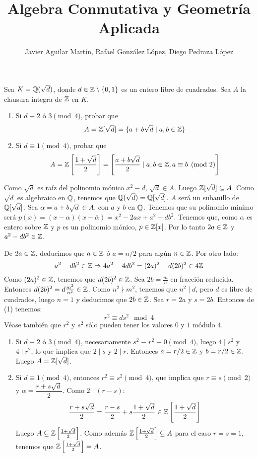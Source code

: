 \documentclass[twoside]{article}
\begin{document}
\title{Algebra Conmutativa y Geometría Aplicada}
\author{Javier Aguilar Martín, Rafael González López, Diego Pedraza López}
\maketitle

\begin{ejercicio}{2}
Sea $K = \mathbb{Q}(\sqrt{d})$, donde $d \in \mathbb{Z}\setminus\{0,1\}$ es un entero libre de cuadrados. Sea $A$ la clausura íntegra de $\mathbb{Z}$ en $K$.
\begin{enumerate}
	\item Si $d \equiv 2$ ó $3 \pmod 4$, probar que
	\[ A = \mathbb{Z}[\sqrt{d}] = \{a + b \sqrt{d} \mid a,b \in \mathbb{Z}\} \]
	
	\item Si $d \equiv 1 \pmod 4$, probar que
	\[ A = \mathbb{Z} \left[\frac{1+\sqrt{d}}{2}\right] = \left[\frac{a+b\sqrt{d}}{2} \mid a,b \in \mathbb{Z}; a \equiv b \pmod 2\right]\]
\end{enumerate}
\end{ejercicio}
\begin{solucion}
Como $\sqrt{d}$ es raíz del polinomio mónico $x^2-d$, $\sqrt{d} \in A$. Luego $\mathbb{Z}[\sqrt{d}] \subseteq A$. Como $\sqrt{d}$ es algebraico en $\mathbb{Q}$, tenemos que $\mathbb{Q}(\sqrt{d})=\mathbb{Q}[\sqrt{d}]$. $A$ será un subanillo de $\mathbb{Q}[\sqrt{d}]$. Sea $α=a+b\sqrt{d} \in A$, con $a$ y $b$ en $\mathbb{Q}$. Tenemos que su polinomio mínimo será $p(x)=(x-α)(x-\overline{α})=x^2-2ax+a^2-db^2$. Tenemos que, como $α$ es entero sobre $\mathbb{Z}$ y $p$ es un polinomio mónico, $p \in \mathbb{Z}[x]$. Por lo tanto $2a \in \mathbb{Z}$ y $a^2-db^2 \in \mathbb{Z}$.

De $2a \in \mathbb{Z}$, deducimos que $a \in \mathbb{Z}$ ó $a = n/2$ para algún $n \in \mathbb{Z}$. Por otro lado:
\begin{equation} a^2-db^2 \in \mathbb{Z} \Rightarrow 4a^2-4db^2=(2a)^2-d(2b)^2 \in 4\mathbb{Z} \end{equation}
Como $(2a)^2 \in \mathbb{Z}$, tenemos que $d(2b)^2 \in \mathbb{Z}$. Sea $2b=\frac{m}{n}$ en fracción reducida. Entonces $d(2b)^2=d\frac{m^2}{n^2} \in \mathbb{Z}$. Como $n^2 \nmid m^2$, tenemos que $n^2 \mid d$, pero $d$ es libre de cuadrados, luego $n=1$ y deducimos que $2b \in \mathbb{Z}$. Sea $r=2a$ y $s=2b$. Entonces de (1) tenemos:
\[ r^2 \equiv d s^2 \mod 4 \]
Véase también que $r^2$ y $s^2$ sólo pueden tener los valores $0$ y $1$ módulo 4.
\begin{enumerate}
	\item Si $d \equiv 2$ ó $3 \pmod 4$, necesariamente $s^2 \equiv r^2 \equiv 0 \pmod 4$, luego $4\mid s^2$ y $4\mid r^2$, lo que implica que $2\mid s$ y $2\mid r$. Entonces $a=r/2 \in \mathbb{Z}$ y $b=r/2 \in \mathbb{Z}$. Luego $A = \mathbb{Z}[\sqrt{d}]$.
	
	\item Si $d \equiv 1 \pmod 4$, entonces $r^2 \equiv s^2 \pmod 4$, que implica que $r \equiv s \pmod 2$ y $α = \dfrac{r+s\sqrt{d}}{2}$. Como $2 \mid (r-s)$:
	\[ \frac{r+s\sqrt{d}}{2} = \frac{r-s}{2}+s\frac{1+\sqrt{d}}{2} \in \mathbb{Z}\left[\frac{1+\sqrt{d}}{2}\right] \]
	Luego $A \subseteq \mathbb{Z}\left[\frac{1+\sqrt{d}}{2}\right]$. Como además $\mathbb{Z}\left[\frac{1+\sqrt{d}}{2}\right] \subseteq A$ para el caso $r=s=1$, tenemos que $\mathbb{Z}\left[\frac{1+\sqrt{d}}{2}\right] = A$.
\end{enumerate}
\end{solucion}
\end{document}
